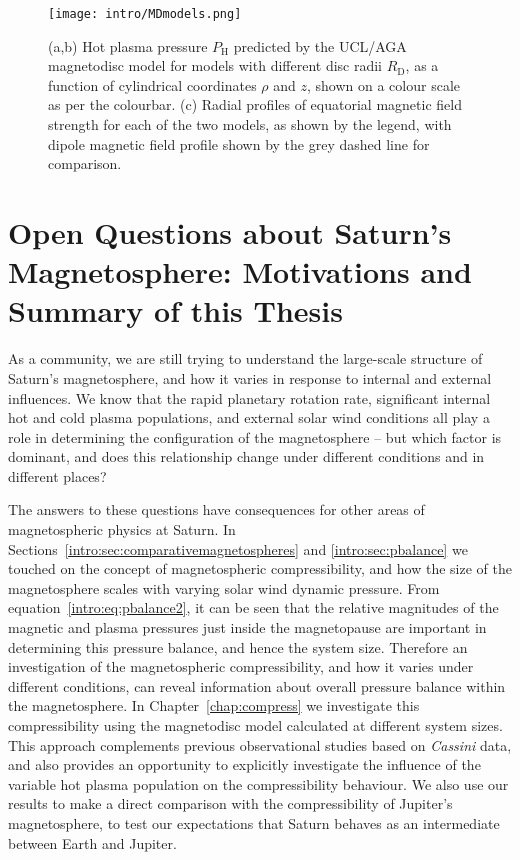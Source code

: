\begin{figure}
\centering
\texttt{[image: intro/MDmodels.png]}
\caption[Magnetic field structure for $R_\mathrm{D}=\SI{21}{R_S}$ and $\SI{27}{R_S}$ UCL/AGA magnetodisc models.]{(a,b) Hot plasma pressure $P_\mathrm{H}$ predicted by the UCL/AGA magnetodisc model for models with different disc radii $R_\mathrm{D}$, as a function of cylindrical coordinates $\rho$ and $z$, shown on a colour scale as per the colourbar. (c) Radial profiles of equatorial magnetic field strength for each of the two models, as shown by the legend, with dipole magnetic field profile  shown by the grey dashed line for comparison.}
\label{intro:fig:MDmodels}
\end{figure}

\section[Open Questions about Saturn's Magnetosphere]{Open Questions about Saturn's Magnetosphere: Motivations and Summary of this Thesis}
As a community, we are still trying to understand the large-scale structure of Saturn's magnetosphere, and how it varies in response to internal and external influences. We know that the rapid planetary rotation rate, significant internal hot and cold plasma populations, and external solar wind conditions all play a role in determining the configuration of the magnetosphere – but which factor is dominant, and does this relationship change under different conditions and in different places?

The answers to these questions have consequences for other areas of magnetospheric physics at Saturn. In Sections~\ref{intro:sec:comparativemagnetospheres} and \ref{intro:sec:pbalance} we touched on the concept of magnetospheric compressibility, and how the size of the magnetosphere scales with varying solar wind dynamic pressure. From equation~\ref{intro:eq:pbalance2}, it can be seen that the relative magnitudes of the magnetic and plasma pressures just inside the magnetopause are important in determining this pressure balance, and hence the system size. Therefore an investigation of the magnetospheric compressibility, and how it varies under different conditions, can reveal information about overall pressure balance within the magnetosphere. In Chapter~\ref{chap:compress} we investigate this compressibility using the \citet{achilleos2010a} magnetodisc model calculated at different system sizes. This approach complements previous observational studies based on \textit{Cassini} data, and also provides an opportunity to explicitly investigate the influence of the variable hot plasma population on the compressibility behaviour. We also use our results to make a direct comparison with the compressibility of Jupiter's magnetosphere, to test our expectations that Saturn behaves as an intermediate between Earth and Jupiter.

